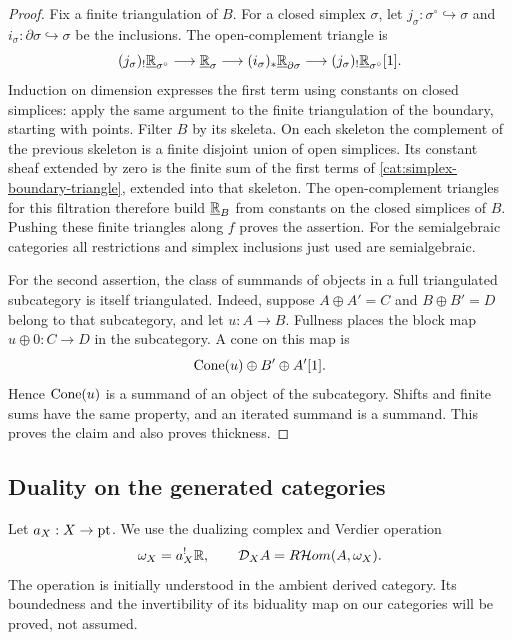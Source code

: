 \begin{proof}
Fix a finite triangulation of $B$.  For a closed simplex $\sigma$, let
$j_\sigma:\sigma^\circ\hookrightarrow\sigma$ and
$i_\sigma:\partial\sigma\hookrightarrow\sigma$ be the inclusions.  The
open-complement triangle is
\begin{equation}
 \label{cat:simplex-boundary-triangle}
 (j_\sigma)_!\underline{\mathbb R}_{\sigma^\circ}
 \longrightarrow\underline{\mathbb R}_{\sigma}
 \longrightarrow(i_\sigma)_*\underline{\mathbb R}_{\partial\sigma}
 \longrightarrow
 (j_\sigma)_!\underline{\mathbb R}_{\sigma^\circ}[1].
\end{equation}
Induction on dimension expresses the first term using constants on closed
simplices: apply the same argument to the finite triangulation of the
boundary, starting with points.  Filter $B$ by its skeleta.  On each
skeleton the complement of the previous skeleton is a finite disjoint
union of open simplices.  Its constant sheaf extended by zero is the
finite sum of the first terms of
\eqref{cat:simplex-boundary-triangle}, extended into that skeleton.
The open-complement triangles for this filtration therefore build
$\underline{\mathbb R}_{B}$ from constants on the closed simplices of $B$.
Pushing these finite triangles along $f$ proves the assertion.  For the
semialgebraic categories all restrictions and simplex inclusions just
used are semialgebraic.

For the second assertion, the class of summands of objects in a full
triangulated subcategory is itself triangulated.  Indeed, suppose
$A\oplus A'=C$ and $B\oplus B'=D$ belong to that subcategory, and let
$u:A\to B$.  Fullness places the block map $u\oplus0:C\to D$ in the
subcategory.  A cone on this map is
\[
 \operatorname{Cone}(u)\oplus B'\oplus A'[1].
\]
Hence $\operatorname{Cone}(u)$ is a summand of an object of the subcategory.  Shifts and
finite sums have the same property, and an iterated summand is a summand.
This proves the claim and also proves thickness.
\end{proof}

\subsection{Duality on the generated categories}

Let $a_X:X\to\mathrm{pt}$.  We use the dualizing complex and Verdier operation
\[
 \omega_X=a_X^!\mathbb R,
 \qquad
 \mathcal D_X A=R\mathcal Hom(A,\omega_X).
\]
The operation is initially understood in the ambient derived category.
Its boundedness and the invertibility of its biduality map on our
categories will be proved, not assumed.


